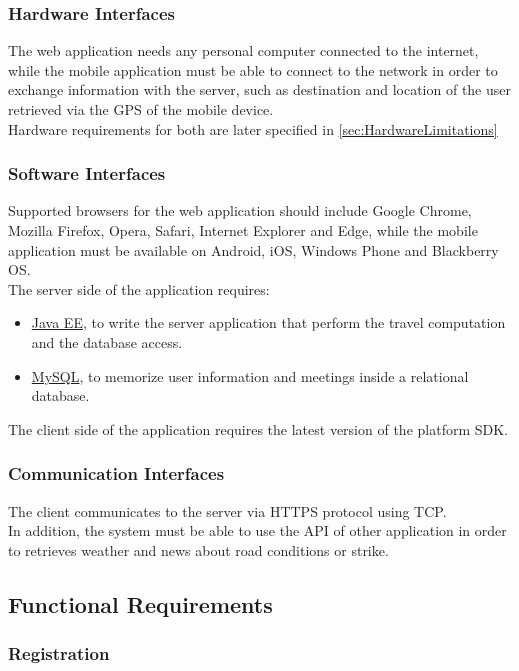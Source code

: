 \subsubsection{Hardware Interfaces}
The web application needs any personal computer connected to the internet, while the mobile application must be able to connect to the network in order to exchange information with the server, such as destination and location of the user retrieved via the GPS of the mobile device.\\
Hardware requirements for both are later specified in \autoref{sec:HardwareLimitations}
\clearpage
\subsubsection{Software Interfaces}
\label{sec:SoftwareInterfaces}
Supported browsers for the web application should include Google Chrome, Mozilla Firefox, Opera, Safari, Internet Explorer and Edge, while the mobile application must be available on Android, iOS, Windows Phone and Blackberry OS.\\
The server side of the application requires: 
\begin{itemize}
	\item \href{http://www.oracle.com/technetwork/java/javaee/overview/index.html}{Java EE}, to write the server application that perform the travel computation and the database access.
	\item \href{https://dev.mysql.com/}{MySQL}, to memorize user information and meetings inside a relational database.
\end{itemize}
The client side of the application requires the latest version of the platform SDK.
\subsubsection{Communication Interfaces}
The client communicates to the server via HTTPS protocol using TCP.\\
In addition, the system must be able to use the API of other application in order to retrieves weather and news about road conditions or strike.

\clearpage

\subsection{Functional Requirements}

\subsubsection{Registration}

